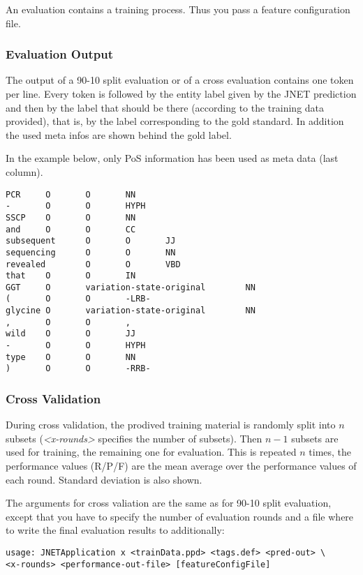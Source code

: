 \documentclass[11pt,a4paper,halfparskip]{scrartcl}
\begin{document}
An evaluation contains a training process. Thus you pass a feature
configuration file. 

\subsubsection{Evaluation Output}
The output of a 90-10 split evaluation or of a cross evaluation
contains one token per line. Every token is followed by the entity
label given by the JNET prediction and then by the label that should
be there (according to the training data provided), that is, by the
label corresponding to the gold standard. In addition the used meta
infos are shown behind the gold label. 


In the example below, only PoS information has been used as meta data
(last column).

\begin{verbatim}
PCR     O       O       NN
-       O       O       HYPH
SSCP    O       O       NN
and     O       O       CC
subsequent      O       O       JJ
sequencing      O       O       NN
revealed        O       O       VBD
that    O       O       IN
GGT     O       variation-state-original        NN
(       O       O       -LRB-
glycine O       variation-state-original        NN
,       O       O       ,
wild    O       O       JJ
-       O       O       HYPH
type    O       O       NN
)       O       O       -RRB-
\end{verbatim}

\subsubsection{Cross Validation}
During cross validation, the prodived training material is randomly
split into $n$ subsets (\textit{<x-rounds>} specifies the number of
subsets). Then $n-1$ subsets are used for training, the remaining one
for evaluation. This is repeated $n$ times, the performance values
(R/P/F) are the mean average over the performance values of each
round. Standard deviation is also shown.

The arguments for cross valiation are the same as for 90-10 split
evaluation, except that you have to specify the number of evaluation
rounds and a file where to write the final evaluation results to
additionally:

\begin{verbatim}
usage: JNETApplication x <trainData.ppd> <tags.def> <pred-out> \
<x-rounds> <performance-out-file> [featureConfigFile]
\end{verbatim}
\end{document}
